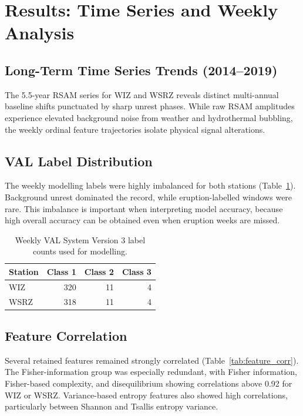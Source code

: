 \documentclass[journal]{IEEEtran}
\begin{document}
\section{Results: Time Series and Weekly Analysis}
\subsection{Long-Term Time Series Trends (2014--2019)}
The 5.5-year RSAM series for WIZ and WSRZ reveals distinct multi-annual baseline shifts punctuated by sharp unrest phases. While raw RSAM amplitudes experience elevated background noise from weather and hydrothermal bubbling, the weekly ordinal feature trajectories isolate physical signal alterations.

\subsection{VAL Label Distribution}
The weekly modelling labels were highly imbalanced for both stations (Table~\ref{tab:label_counts}). Background unrest dominated the record, while eruption-labelled windows were rare. This imbalance is important when interpreting model accuracy, because high overall accuracy can be obtained even when eruption weeks are missed.

\begin{table}[!t]
\centering
\caption{Weekly VAL System Version 3 label counts used for modelling.}
\label{tab:label_counts}
\begin{tabular}{lrrr}
\toprule
Station & Class 1 & Class 2 & Class 3 \\
\midrule
WIZ  & 320 & 11 & 4 \\
WSRZ & 318 & 11 & 4 \\
\bottomrule
\end{tabular}
\end{table}

\subsection{Feature Correlation}
\label{sec:cluster_results}
Several retained features remained strongly correlated (Table~\ref{tab:feature_corr}). The Fisher-information group was especially redundant, with Fisher information, Fisher-based complexity, and disequilibrium showing correlations above 0.92 for WIZ or WSRZ. Variance-based entropy features also showed high correlations, particularly between Shannon and Tsallis entropy variance.
\end{document}
